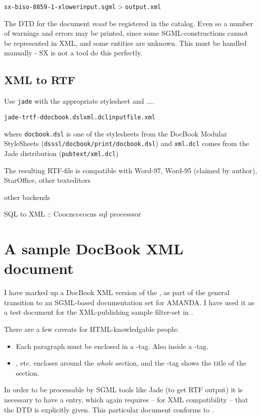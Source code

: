 \begin{alltt}
  sx -biso-8859-1 -xlower input.sgml $>$ output.xml
\end{alltt}

The DTD for the document \textit{must} be registered in the
\textsf{catalog}.  Even so a number of warnings and errors may be
printed, since some SGML-constructions cannot be represented in XML,
and some entities are unknown.  This must be handled manually - SX is
not a tool do this perfectly.


\subsection{XML to RTF}
\label{sec:docbook-xml-to-rtf}

Use \texttt{jade} with the appropriate stylesheet and \textsf{....}

\begin{alltt}
         jade -t rtf -d docbook.dsl xml.dcl inputfile.xml
\end{alltt}

where \texttt{docbook.dsl} is one of the stylesheets from the
\textsf{DocBook Modular StyleSheets}
(\texttt{dsssl/docbook/print/docbook.dsl}) and \texttt{xml.dcl} comes
from the Jade distribution (\texttt{pubtext/xml.dcl})

The resulting RTF-file is compatible with Word-97, Word-95 (claimed by
author), StarOffice, \textsf{other texteditors} 

\textsf{other backends}

SQL to XML :: Coocncococns sql processsor

\section{A sample DocBook XML document}
\label{sec:amanda-readme.xml}

I have marked up a DocBook XML version of the
, as part of the general transition to an
SGML-based documentation set for AMANDA.  I have used it as a test
document for the XML-publishing sample filter-set in
.

There are a few caveats for HTML-knowledgable people:

\begin{itemize}
\item Each paragraph must be enclosed in a -tag.  Also
  inside a -tag.
\item {},  etc. encloses around the \textit{whole} section, and the
  -tag shows the title of the section.
\end{itemize}  
In order to be processable by SGML tools like Jade (to get RTF output)
it is necessary to have a  entry, which again requires
-- for XML compatibility -- that the DTD is explicitly given.  This
particular document conforms to
.




